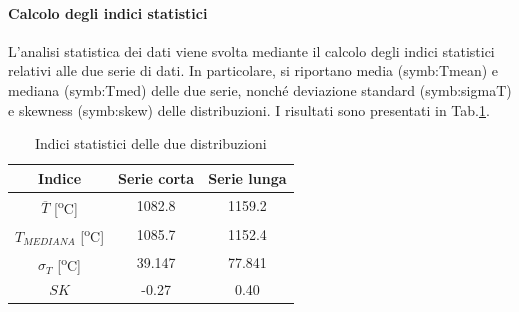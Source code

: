 \paragraph{Calcolo degli indici statistici}
L'analisi statistica dei dati viene svolta mediante il calcolo degli indici statistici relativi alle due serie di dati. In particolare, si riportano media (\gls{symb:Tmean}) e mediana (\gls{symb:Tmed}) delle due serie, nonché deviazione standard (\gls{symb:sigmaT}) e skewness (\gls{symb:skew}) delle distribuzioni. I risultati sono presentati in Tab.\ref{tab:indicistat}.

\begin{table} [H]
	\centering
	\begin{tabular}{c|c|c}
		\toprule
		\toprule
		\textbf{Indice} & \textbf{Serie corta}&\textbf{Serie lunga}\\
		\midrule
		\midrule
		$\overline{T}$ [\textsuperscript{o}C]& 1082.8 & 1159.2\\
		\midrule
		$T_\textit{MEDIANA}$ [\textsuperscript{o}C]&1085.7&1152.4\\
		\midrule
		$\sigma_T$ [\textsuperscript{o}C]&39.147 & 77.841\\
		\midrule
		$SK$ & -0.27 & 0.40 \\
		\bottomrule
		\bottomrule
	\end{tabular}
\caption{Indici statistici delle due distribuzioni}
\label{tab:indicistat}
\end{table}

